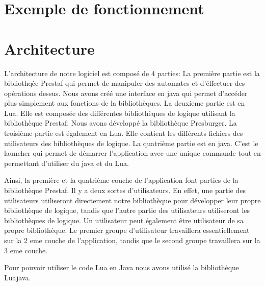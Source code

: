 \documentclass{article}%
\begin{document}
\section{Exemple de fonctionnement}

\section{Architecture}

L'architecture de notre logiciel est composé de 4 parties:
La première partie est la bibliothqèe Prestaf qui permet de manipuler des automates et d'éffectuer des opérations dessus. Nous avons créé une interface en java qui permet d'accéder plus simplement aux fonctions de la bibliothèques.
La deuxieme partie est en Lua. Elle est composée des différentes bibliothèques de logique utilisant la bibliothèque Prestaf. Nous avons développé la bibliothèque Presburger.
La troisième partie est également en Lua. Elle contient les différents fichiers des utilisateurs des bibliothèques de logique.
La quatrième partie est en java. C'est le launcher qui permet de démarrer l'application avec une unique commande tout en permettant d'utiliser du java et du Lua.

Ainsi, la première et la quatrième couche de l'application font parties de la bibliothèque Prestaf. Il y a deux sortes d'utilisateurs. En effet, une partie des utilisateurs utiliseront directement notre bibliothèque pour développer leur propre bibliothèque de logique,
tandis que l'autre partie des utilisateurs utiliseront les bibliothèques de logique. Un utilisateur peut également être utilisateur de sa propre bibliothèque. Le premier groupe d'utilisateur travaillera essentiellement sur la 2 eme couche de l'application, 
tandis que le second groupe travaillera sur la 3 eme couche.

Pour pouvoir utiliser le code Lua en Java nous avons utilisé la bibliothèque Luajava.
\end{document}
